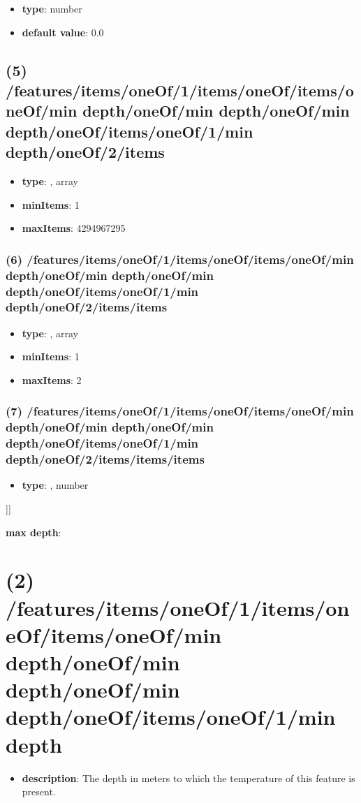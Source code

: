 \begin{itemize}[leftmargin=6em]\item {\bf type}: number\item {\bf default value}: 0.0
\end{itemize}\subsection{(5) /features/items/oneOf/1/items/oneOf/items/oneOf/min depth/oneOf/min depth/oneOf/min depth/oneOf/items/oneOf/1/min depth/oneOf/2/items}
\begin{itemize}[leftmargin=5em]\item {\bf type}: , array\item {\bf minItems}: 1
\item {\bf maxItems}: 4294967295
\end{itemize}\subsubsection{(6) /features/items/oneOf/1/items/oneOf/items/oneOf/min depth/oneOf/min depth/oneOf/min depth/oneOf/items/oneOf/1/min depth/oneOf/2/items/items}
\begin{itemize}[leftmargin=6em]\item {\bf type}: , array\item {\bf minItems}: 1
\item {\bf maxItems}: 2
\end{itemize}\subsubsection{(7) /features/items/oneOf/1/items/oneOf/items/oneOf/min depth/oneOf/min depth/oneOf/min depth/oneOf/items/oneOf/1/min depth/oneOf/2/items/items/items}
\begin{itemize}[leftmargin=7em]\item {\bf type}: , number\end{itemize}]]\item {\bf max depth}: \section{(2) /features/items/oneOf/1/items/oneOf/items/oneOf/min depth/oneOf/min depth/oneOf/min depth/oneOf/items/oneOf/1/min depth}
\begin{itemize}[leftmargin=2em]\item {\bf description}: The depth in meters to which the temperature of this feature is present.
\end{itemize}
